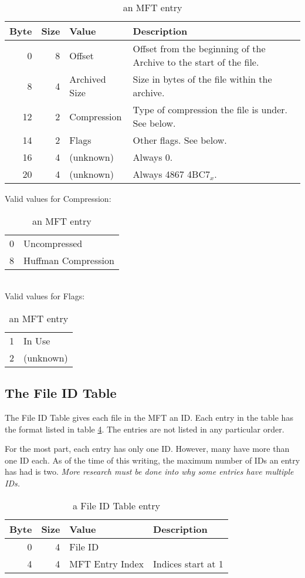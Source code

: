 \begin{table}[pb]
	\caption{an MFT entry}
	\label{tab:mftent}
	
	\begin{tabular}{|r|r|l|p{3in}|}
		\hline
		\textbf{Byte} & \textbf{Size} & \textbf{Value} & \textbf{Description} \\
		\hline
		 0 & 8 & Offset        & Offset from the beginning of the Archive to the
		                         start of the file.  \\
		\hline
		 8 & 4 & Archived Size & Size in bytes of the file within the archive.  \\
		\hline
		12 & 2 & Compression   & Type of compression the file is under.  See
		                         below.  \\
		\hline
		14 & 2 & Flags         & Other flags.  See below.  \\
		\hline
		16 & 4 & (unknown)     & Always 0.  \\
		\hline
		20 & 4 & (unknown)     & Always 4867 4BC7$_x$.  \\
		\hline
	\end{tabular}
	
	Valid values for Compression:
	\begin{tabular}{rl}
		\hline
		0 & Uncompressed \\
		8 & Huffman Compression \\
		\hline
	\end{tabular}
	\\
	
	Valid values for Flags:
	\begin{tabular}{rl}
		\hline
		1 & In Use \\
		2 & (unknown) \\
		\hline
	\end{tabular}
\end{table}


\subsection{The File ID Table}
\label{subsec:fidtab}

The File ID Table gives each file in the MFT an ID.  Each entry in the table
has the format listed in table \ref{tab:fident}.  The entries are not listed in
any particular order.

For the most part, each entry has only one ID.  However,
many have more than one ID each.  As of the time of this writing, the maximum
number of IDs an entry has had is two.  \emph{More research must be done into
why some entries have multiple IDs.}

\begin{table}[pb]
	\caption{a File ID Table entry}
	\label{tab:fident}

	\begin{tabular}{|r|r|l|p{3in}|}
		\hline
		\textbf{Byte} & \textbf{Size} & \textbf{Value} & \textbf{Description}
		\\\hline
		0 & 4 & File ID         &
		\\\hline
		4 & 4 & MFT Entry Index & Indices start at 1
		\\\hline
	\end{tabular}
\end{table}

